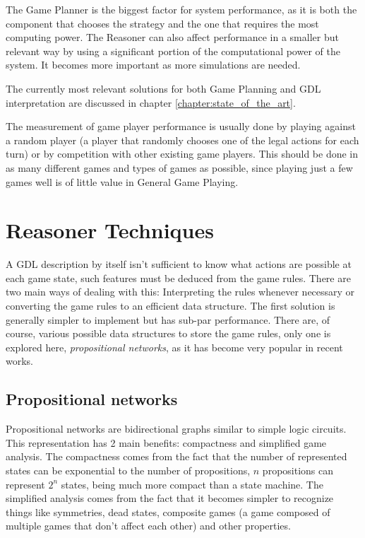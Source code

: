 The Game Planner is the biggest factor for system performance, as it is both the component that chooses the strategy and the one that requires the most computing power. The Reasoner can also affect performance in a smaller but relevant way by using a significant portion of the computational power of the system. It becomes more important as more simulations are needed. 

The currently most relevant solutions for both Game Planning and GDL interpretation are discussed in chapter \ref{chapter:state_of_the_art}.

The measurement of game player performance is usually done by playing against a random player (a player that randomly chooses one of the legal actions for each turn) or by competition with other existing game players. This should be done in as many different games and types of games as possible, since playing just a few games well is of little value in General Game Playing.  


\section{Reasoner Techniques}
A \gls{GDL} description by itself isn't sufficient to know what actions are possible at each game state, such features must be deduced from the game rules. 
There are two main ways of dealing with this:
Interpreting the rules whenever necessary or converting the game rules to an efficient data structure. The first solution is generally simpler to implement but has sub-par performance. There are, of course, various possible data structures to store the game rules, only one is explored here, \textit{propositional networks}, as it has become very popular in recent works.


\subsection{Propositional networks}

Propositional networks are bidirectional graphs similar to simple logic circuits.
This representation has 2 main benefits: compactness and simplified game analysis.
The compactness comes from the fact that the number of represented states can be exponential to the number of propositions, $n$ propositions can represent $2^{n}$ states, being much more compact than a state machine.
The simplified analysis comes from the fact that it becomes simpler to recognize things like symmetries, dead states, composite games (a game composed of multiple games that don't affect each other) and other properties.

